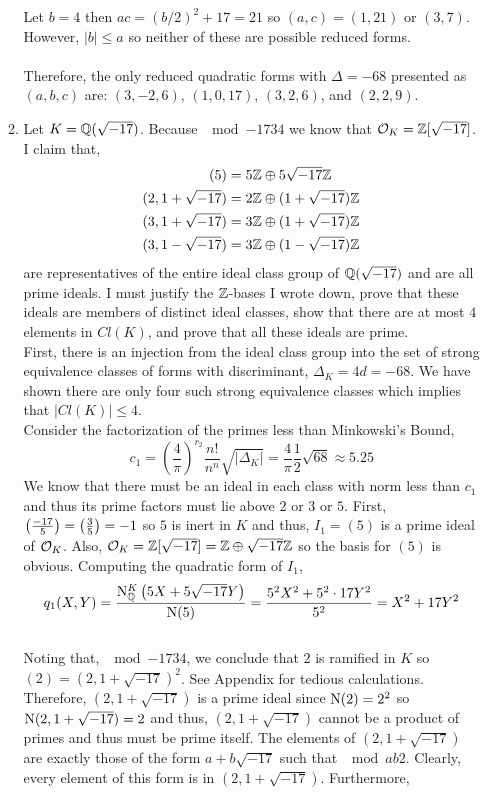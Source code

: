 \documentclass[12pt]{extarticle}
\begin{document}
\begin{enumerate}
\begin{enumerate}
Let $b = 4$ then $ac = (b/2)^2 + 17 = 21$ so $(a,c) = (1, 21)$ or $(3, 7)$. However, $|b| \le a$ so neither of these are possible reduced forms. \\\\
Therefore, the only reduced quadratic forms with $\Delta = -68$ presented as $(a,b,c)$ are: $(3, -2, 6)$, $(1, 0, 17)$, $(3, 2, 6)$, and $(2, 2, 9)$.

\item Let $K = \mathbb{Q}(\sqrt{-17})$. Because $\mod{-17}{3}{4}$ we know that $\mathcal{O}_{K} = \mathbb{Z}[\sqrt{-17}]$. I claim that, 
\begin{align*}
(5) &= 5 \mathbb{Z} \oplus 5 \sqrt{-17} \mathbb{Z} \\
(2, 1 + \sqrt{-17}) & = 2 \mathbb{Z} \oplus (1 + \sqrt{-17}) \mathbb{Z} \\
(3, 1 + \sqrt{-17}) & = 3 \mathbb{Z} \oplus (1 + \sqrt{-17}) \mathbb{Z} \\
(3, 1 - \sqrt{-17}) & = 3 \mathbb{Z} \oplus (1 - \sqrt{-17}) \mathbb{Z}
\end{align*}  
are representatives of the entire ideal class group of $\mathbb{Q}(\sqrt{-17})$ and are all prime ideals. I must justify the $\mathbb{Z}$-bases I wrote down, prove that these ideals are members of distinct ideal classes, show that there are at most $4$ elements in $Cl(K)$, and prove that all these ideals are prime. \bigskip \\
First, there is an injection from the ideal class group into the set of strong equivalence classes of forms with discriminant, $\Delta_K = 4d = - 68$. We have shown there are only four such strong equivalence classes which implies that $|Cl(K)| \le 4$. \bigskip \\
Consider the factorization of the primes less than Minkowski's Bound, 
\[c_1 = \left(\frac{4}{\pi}\right)^{r_2} \frac{n!}{n^n} \sqrt{|\Delta_K|} = \frac{4}{\pi} \frac{1}{2} \sqrt{68} \approx 5.25\]
We know that there must be an ideal in each class with norm less than $c_1$ and thus its prime factors must lie above $2$ or $3$ or $5$. First, $\left(\frac{-17}{5} \right) = \left(\frac{3}{5} \right) = -1$ so $5$ is inert in $K$ and thus, $I_1 = (5)$ is a prime ideal of $\mathcal{O}_{K}$. Also, $\mathcal{O}_{K} = \mathbb{Z}[\sqrt{-17}] = \mathbb{Z} \oplus \sqrt{-17} \mathbb{Z}$ so the basis for $(5)$ is obvious. Computing the quadratic form of $I_1$,
\[q_1(X,Y) = \frac{\mathrm{N}^{K}_{\mathbb{Q}}\left(5 X + 5 \sqrt{-17} Y\right)}{\mathrm{N}(5)} = \frac{5^2 X^2 + 5^2 \cdot 17 Y^2}{5^2} = X^2 + 17 Y^2\] \bigskip \\
Noting that, $\mod{-17}{3}{4}$, we conclude that $2$ is ramified in $K$ so $(2) = (2, 1 + \sqrt{-17})^2$. See Appendix for tedious calculations. Therefore, $(2, 1 + \sqrt{-17})$ is a prime ideal since $\mathrm{N}(2) = 2^2$ so $\mathrm{N}(2, 1 + \sqrt{-17}) = 2$ and thus, $(2, 1 + \sqrt{-17})$ cannot be a product of primes and thus must be prime itself. The elements of $(2, 1 + \sqrt{-17})$ are exactly those of the form $a + b \sqrt{-17}$ such that $\mod{a}{b}{2}$. Clearly, every element of this form is in $(2, 1 + \sqrt{-17})$. Furthermore, 

\end{enumerate}
\end{enumerate}
\end{document}
